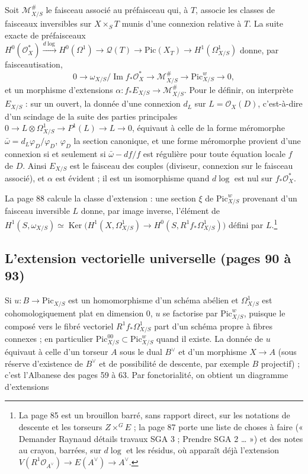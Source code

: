 \documentclass[11pt,a4paper]{article}
\begin{document}
Soit $\mathcal{M}^\#_{X/S}$ le faisceau associé au préfaisceau qui, à $T$,
associe les classes de faisceaux inversibles sur $X \times_S T$ munis d'une
connexion relative à $T$. La suite exacte de préfaisceaux
$H^0(\mathcal{O}^*_X) \xrightarrow{d\log} H^0(\Omega^1) \to \mathcal{Q}(T) \to \mathrm{Pic}(X_T) \to H^1(\Omega^1_{X/S})$
donne, par faisceautisation,
\[
0 \to \omega_{X/S}/\operatorname{Im} f_*\mathcal{O}^*_X \to \mathcal{M}^\#_{X/S} \to \mathrm{Pic}^w_{X/S} \to 0 ,
\]
et un morphisme d'extensions $\alpha \colon f_*E_{X/S} \to \mathcal{M}^\#_{X/S}$.
Pour le définir, on interprète $E_{X/S}$ : sur un ouvert, la donnée d'une
connexion $d_L$ sur $L = \mathcal{O}_X(D)$, c'est-à-dire d'un scindage de la
suite des parties principales
$0 \to L \otimes \Omega^1_{X/S} \to P^1(L) \to L \to 0$, équivaut à celle de
la forme méromorphe $\bar\omega = d_L\varphi_D/\varphi_D$, $\varphi_D$ la
section canonique, et une forme méromorphe provient d'une connexion si et
seulement si $\bar\omega - df/f$ est régulière pour toute équation locale $f$
de $D$. Ainsi $E_{X/S}$ est le faisceau des couples (diviseur, connexion sur le
faisceau associé), et $\alpha$ est évident ; il est un isomorphisme quand
$d\log$ est nul sur $f_*\mathcal{O}^*_X$.

La page 88 calcule la classe d'extension : une section $\xi$ de
$\mathrm{Pic}^w_{X/S}$ provenant d'un faisceau inversible $L$ donne, par image
inverse, l'élément de
$H^1(S, \omega_{X/S}) \simeq \operatorname{Ker}\bigl(H^1(X, \Omega^1_{X/S}) \to H^0(S, R^1 f_*\Omega^1_{X/S})\bigr)$
défini par $L$.\footnote{La page 85 est un brouillon barré, sans rapport
direct, sur les notations de descente et les torseurs $Z \times^G E$ ; la
page 87 porte une liste de choses à faire (« Demander Raynaud détails travaux
SGA 3 ; Prendre SGA 2 … ») et des notes au crayon, barrées, sur $d\log$ et les
résidus, où apparaît déjà l'extension $V(R^1\mathcal{O}_{A^\vee}) \to E(A^\vee) \to A^\vee$.}

\subsection*{L'extension vectorielle universelle (pages 90 à 93)}

Si $u \colon B \to \mathrm{Pic}_{X/S}$ est un homomorphisme d'un schéma abélien
et $\Omega^1_{X/S}$ est cohomologiquement plat en dimension $0$, $u$ se
factorise par $\mathrm{Pic}^w_{X/S}$, puisque le composé vers le fibré
vectoriel $R^1 f_*\Omega^1_{X/S}$ part d'un schéma propre à fibres connexes ;
en particulier $\mathrm{Pic}^{00}_{X/S} \subset \mathrm{Pic}^w_{X/S}$ quand il
existe. La donnée de $u$ équivaut à celle d'un torseur $A$ sous le dual
$B^\vee$ et d'un morphisme $X \to A$ (sous réserve d'existence de $B^\vee$ et
de possibilité de descente, par exemple $B$ projectif) ; c'est l'Albanese des
pages 59 à 63. Par fonctorialité, on obtient un diagramme d'extensions
\end{document}
